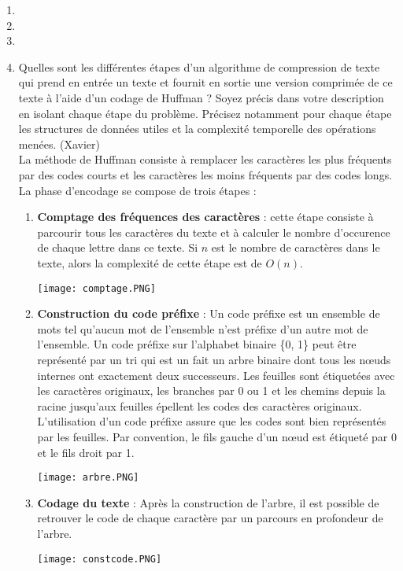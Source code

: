 \documentclass[11pt]{article}
\begin{document}
\begin{enumerate}
\item
\item
\item

\item Quelles sont les différentes étapes d’un algorithme de compression de texte qui
prend en entrée un texte et fournit en sortie une version comprimée de ce texte à
l’aide d’un codage de Huffman ? Soyez précis dans votre description en isolant
chaque étape du problème. Précisez notamment pour chaque étape les structures
de données utiles et la complexité temporelle des opérations menées. (Xavier)\\

La méthode de Huffman consiste à remplacer les caractères les plus fréquents par des codes
courts et les caractères les moins fréquents par des codes longs. La phase d’encodage se compose de trois étapes :
\begin{enumerate}
\item \textbf{Comptage des fréquences des caractères} : cette étape consiste à parcourir tous les caractères du texte et à calculer le nombre d'occurence de chaque lettre dans ce texte. Si $n$ est le nombre de caractères dans le texte, alors la complexité de cette étape est de $O(n)$.
\begin{center}
    \texttt{[image: comptage.PNG]}
\end{center}
\item \textbf{Construction du code préfixe} : Un code préfixe est un ensemble de mots tel qu’aucun mot de
l’ensemble n’est préfixe d’un autre mot de l’ensemble. Un code préfixe sur l’alphabet binaire \{0, 1\} peut être représenté par
un tri qui est un fait un arbre binaire dont tous les nœuds internes ont exactement deux successeurs. Les feuilles sont étiquetées avec les caractères originaux, les branches par 0 ou 1 et les chemins depuis la racine jusqu’aux feuilles épellent les codes des caractères originaux. L’utilisation d’un code préfixe assure que les codes sont bien représentés par les feuilles. Par convention, le fils gauche d’un nœud est étiqueté par 0 et le fils droit
par 1.
\begin{center}
    \texttt{[image: arbre.PNG]}
\end{center}
\item \textbf{Codage du texte} : Après la construction de l’arbre, il est possible de retrouver le code de
chaque caractère par un parcours en profondeur de l’arbre. 
\begin{center}
    \texttt{[image: constcode.PNG]}

\end{center}
\end{enumerate}
\end{enumerate}
\end{document}
